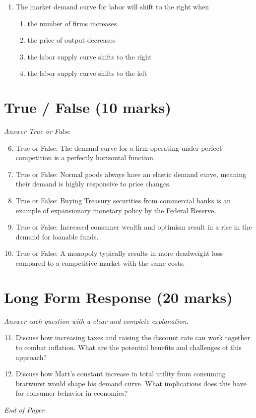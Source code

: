 \documentclass[12pt]{article}
\begin{document}
\begin{enumerate}[label=\arabic*.]
\begin{enumerate}[label=(\alph*)]
    \item depreciate.
    \item remain unchanged.
    \item change indeterminately.
\end{enumerate}
\item The market demand curve for labor will shift to the right when
\begin{enumerate}[label=(\alph*)]
    \item the number of firms increases
    \item the price of output decreases
    \item the labor supply curve shifts to the right
    \item the labor supply curve shifts to the left
\end{enumerate}
\end{enumerate}

\section*{True / False (10 marks)}
\textit{Answer True or False}
\begin{enumerate}[label=\arabic*.]
\setcounter{enumi}{5}
\item True or False: The demand curve for a firm operating under perfect competition is a perfectly horizontal function.
\item True or False: Normal goods always have an elastic demand curve, meaning their demand is highly responsive to price changes.
\item True or False: Buying Treasury securities from commercial banks is an example of expansionary monetary policy by the Federal Reserve.
\item True or False: Increased consumer wealth and optimism result in a rise in the demand for loanable funds.
\item True or False: A monopoly typically results in more deadweight loss compared to a competitive market with the same costs.
\end{enumerate}

\section*{Long Form Response (20 marks)}
\textit{Answer each question with a clear and complete explanation.}
\begin{enumerate}[label=\arabic*.]
\setcounter{enumi}{10}
\item Discuss how increasing taxes and raising the discount rate can work together to combat inflation. What are the potential benefits and challenges of this approach?
\item Discuss how Matt's constant increase in total utility from consuming bratwurst would shape his demand curve. What implications does this have for consumer behavior in economics?
\end{enumerate}

\vfill
\noindent\textit{End of Paper}
\end{document}
